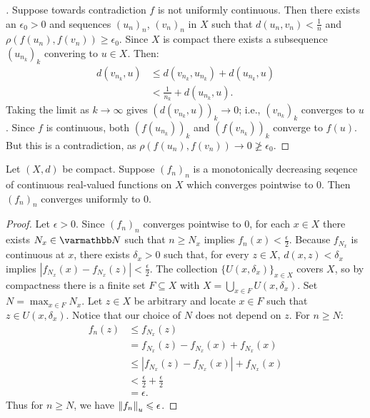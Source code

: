     \begin{proof}[]
        Suppose towards contradiction $f$ is not uniformly continuous. Then there exists an $\epsilon_0 > 0$ and sequences $(u_n)_n$, $(v_n)_n$ in $X$ such that $d(u_n,v_n) < \frac{1}{n}$ and $\rho(f(u_n),f(v_n)) \geq \epsilon_0$. Since $X$ is compact there exists a subsequence $(u_{n_k})_k$ convering to $u \in X$. Then:
            \begin{equation*}
            \begin{split}
                d(v_{n_k}, u) 
                &\leq d(v_{n_k},u_{n_k}) + d(u_{n_k},u)\\
                & < \frac{1}{n_k} + d(u_{n_k},u).
            \end{split}
            \end{equation*}
        Taking the limit as $k \rightarrow \infty$ gives $(d(v_{n_k},u))_k \rightarrow 0$; i.e., $(v_{n_k})_k$ converges to $u$. Since $f$ is continuous, both $(f(u_{n_k}))_k$ and $(f(v_{n_k}))_k$ converge to $f(u)$. But this is a contradiction, as $\rho(f(u_n),f(v_n)) \rightarrow 0 \not\geq \epsilon_0$. 
    \end{proof}

    \begin{lemma}\label{lemma:dini}
        Let $(X,d)$ be compact. Suppose $(f_n)_n$ is a monotonically decreasing seqence of continuous real-valued functions on $X$ which converges pointwise to $0$. Then $(f_n)_n$ converges uniformly to $0$.
    \end{lemma}
        \begin{proof}
            Let $\epsilon > 0$. Since $(f_n)_n$ converges pointwise to $0$, for each $x \in X$ there exists $N_x \in \bfN$ such that $n \geq N_x$ implies $f_n(x) < \frac{\epsilon}{2}$. Because $f_{N_x}$ is continuous at $x$, there exists $\delta_x > 0$ such that, for every $z \in X$, $d(x,z) < \delta_x$ implies $|f_{N_x}(x) - f_{N_x}(z)| < \frac{\epsilon}{2}$. The collection $\{U(x,\delta_x)\}_{x \in X}$ covers $X$, so by compactness there is a finite set $F \subseteq X$ with $X = \bigcup_{x \in F} U(x,\delta_x)$. Set $N = \max_{x \in F} N_x$. Let $z \in X$ be arbitrary and locate $x \in F$ such that $z \in U(x,\delta_x)$. Notice that our choice of $N$ does not depend on $z$. For $n \geq N$:
                \begin{equation*}
                \begin{split}
                    f_n(z) 
                    & \leq f_{N_x}(z) \\
                    & = f_{N_x}(z) - f_{N_x}(x) + f_{N_x}(x) \\
                    & \leq |f_{N_x}(z) - f_{N_x}(x)| + f_{N_x}(x) \\
                    & < \frac{\epsilon}{2} + \frac{\epsilon}{2} \\
                    & = \epsilon.
                \end{split}
                \end{equation*}
            Thus for $n \geq N$, we have $\left\lVert f_n \right\rVert_u \leqslant \epsilon$.
        \end{proof}

